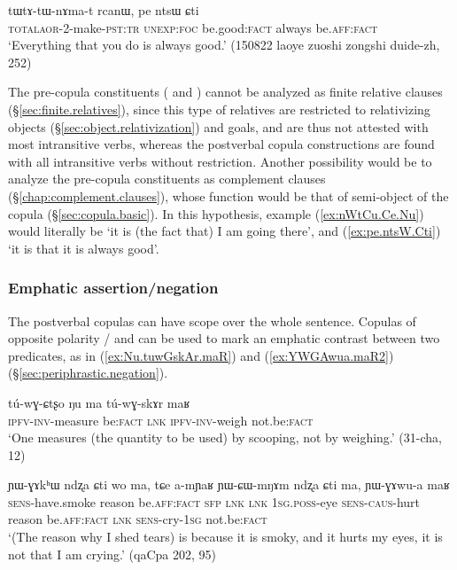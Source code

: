 \begin{exe}
\ex \label{ex:pe.ntsW.Cti}
\gll  tɯ\redp{}tɤ-tɯ-nɤma-t rcanɯ, pe ntsɯ ɕti\\
\textsc{total}\redp{}\textsc{aor}-2-make-\textsc{pst}:\textsc{tr} \textsc{unexp}:\textsc{foc} be.good:\textsc{fact} always be.\textsc{aff}:\textsc{fact}\\
\glt `Everything that you do is always good.' (150822 laoye zuoshi zongshi duide-zh, 252)
\end{exe}

The pre-copula constituents ( and ) cannot be analyzed as finite relative clauses (§\ref{sec:finite.relatives}), since this type of relatives are restricted to relativizing objects (§\ref{sec:object.relativization}) and goals, and are thus not attested with most intransitive verbs, whereas the postverbal copula constructions are found with all intransitive verbs without restriction. Another possibility would be to analyze the pre-copula constituents as complement clauses (§\ref{chap:complement.clauses}), whose function would be that of semi-object of the copula (§\ref{sec:copula.basic}). In this hypothesis, example (\ref{ex:nWtCu.Ce.Nu}) would literally be `it is (the fact that) I am going there', and (\ref{ex:pe.ntsW.Cti}) `it is that it is always good'.

 
\subsubsection{Emphatic assertion/negation} \label{sec:affirmative.copula.function}
The postverbal copulas can have scope over the whole sentence. Copulas of opposite polarity / and  can be used to mark an emphatic contrast between two predicates, as in (\ref{ex:Nu.tuwGskAr.maR}) and (\ref{ex:YWGAwua.maR2}) (§\ref{sec:periphrastic.negation}).

\begin{exe}
\ex \label{ex:Nu.tuwGskAr.maR}
\gll  tú-wɣ-ɕtʂo ŋu ma tú-wɣ-skɤr maʁ \\
\textsc{ipfv}-\textsc{inv}-measure be:\textsc{fact} \textsc{lnk} \textsc{ipfv}-\textsc{inv}-weigh not.be:\textsc{fact} \\
\glt `One measures (the quantity to be used) by scooping, not by weighing.' (31-cha, 12)
\end{exe}

\begin{exe}
\ex \label{ex:YWGAwua.maR2}
\gll ɲɯ-ɣɤkʰɯ ndʐa ɕti wo ma, tɕe a-mɲaʁ ɲɯ-ɕɯ-mŋɤm ndʐa ɕti ma, ɲɯ-ɣɤwu-a maʁ \\
\textsc{sens}-have.smoke reason be.\textsc{aff}:\textsc{fact} \textsc{sfp} \textsc{lnk} \textsc{lnk} \textsc{1sg}.\textsc{poss}-eye \textsc{sens}-\textsc{caus}-hurt reason be.\textsc{aff}:\textsc{fact} \textsc{lnk} \textsc{sens}-cry-\textsc{1sg} not.be:\textsc{fact} \\
\glt `(The reason why I shed tears) is because it is smoky, and it hurts my eyes, it is not that I am crying.' (qaCpa 202, 95)
\end{exe}


